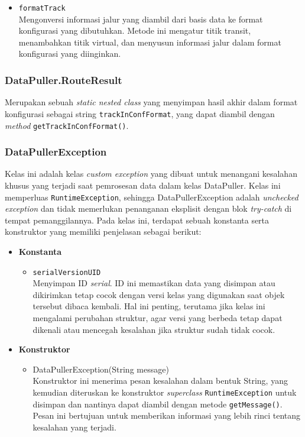 \begin{itemize}
\begin{itemize}
         \item \texttt{formatTrack}
         \\ Mengonversi informasi jalur yang diambil dari basis data ke format konfigurasi yang dibutuhkan. Metode ini mengatur titik transit, menambahkan titik virtual, dan menyusun informasi jalur dalam format konfigurasi yang diinginkan.
    \end{itemize}
\end{itemize}

\subsubsection{DataPuller.RouteResult}
Merupakan sebuah \textit{static nested class} yang menyimpan hasil akhir dalam format konfigurasi sebagai string \texttt{trackInConfFormat}, yang dapat diambil dengan \textit{method} \texttt{getTrackInConfFormat()}.

\subsubsection{DataPullerException}
Kelas ini adalah kelas \textit{custom exception} yang dibuat untuk menangani kesalahan khusus yang terjadi saat pemrosesan data dalam kelas DataPuller. Kelas ini memperluas \texttt{RuntimeException}, sehingga DataPullerException adalah \textit{unchecked exception} dan tidak memerlukan penanganan eksplisit dengan blok \textit{try-catch} di tempat pemanggilannya. Pada kelas ini, terdapat sebuah konstanta serta konstruktor yang memiliki penjelasan sebagai berikut:
\begin{itemize}
    \item \textbf{Konstanta}
    \begin{itemize}
        \item \texttt{serialVersionUID}
        \\ Menyimpan ID \textit{serial}. ID ini memastikan data yang disimpan atau dikirimkan tetap cocok dengan versi kelas yang digunakan saat objek tersebut dibaca kembali. Hal ini penting, terutama jika kelas ini mengalami perubahan struktur, agar versi yang berbeda tetap dapat dikenali atau mencegah kesalahan jika struktur sudah tidak cocok.
    \end{itemize}
    
    \item \textbf{Konstruktor}
    \begin{itemize}
        \item DataPullerException(String message)
        \\ Konstruktor ini menerima pesan kesalahan dalam bentuk String, yang kemudian diteruskan ke konstruktor \textit{superclass} \texttt{RuntimeException} untuk disimpan dan nantinya dapat diambil dengan metode \texttt{getMessage()}. Pesan ini bertujuan untuk memberikan informasi yang lebih rinci tentang kesalahan yang terjadi.
    \end{itemize}
\end{itemize}

